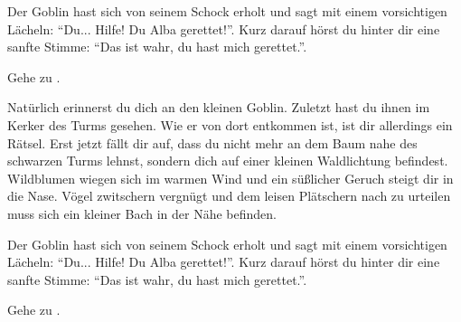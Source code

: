 Der Goblin hast sich von seinem Schock erholt und sagt mit einem vorsichtigen Lächeln: ``Du... Hilfe! Du Alba gerettet!''. Kurz darauf hörst du hinter dir eine sanfte Stimme: ``Das ist wahr, du hast mich gerettet.''.

Gehe zu .


Natürlich erinnerst du dich an den kleinen Goblin.
Zuletzt hast du ihnen im Kerker des Turms gesehen.
Wie er von dort entkommen ist, ist dir allerdings ein Rätsel.
Erst jetzt fällt dir auf, dass du nicht mehr an dem Baum nahe des schwarzen Turms lehnst, sondern dich auf einer kleinen Waldlichtung befindest.
Wildblumen wiegen sich im warmen Wind und ein süßlicher Geruch steigt dir in die Nase. Vögel zwitschern vergnügt und dem leisen Plätschern nach zu urteilen muss sich ein kleiner Bach in der Nähe befinden.

Der Goblin hast sich von seinem Schock erholt und sagt mit einem vorsichtigen Lächeln: ``Du... Hilfe! Du Alba gerettet!''. Kurz darauf hörst du hinter dir eine sanfte Stimme: ``Das ist wahr, du hast mich gerettet.''.

Gehe zu .

